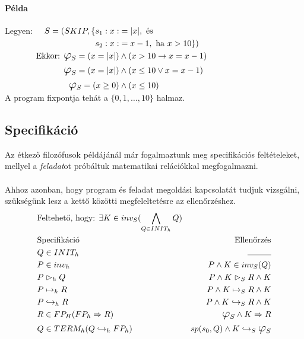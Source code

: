 \documentclass[12pt]{article}
\begin{document}
	\paragraph{Példa}
	Legyen: 
	$
	\begin{aligned}[t]
	S = (SKIP, \{s_1: x :&= |x|, \text{ és}\\
	s_2: x :&= x-1, \text{ ha } x > 10\})\\
	\text{Ekkor: }\mathlarger{\mathlarger{\varphi}}_S = (x = |x|) &\land (x>10 \rightarrow x = x-1)\\
	\mathlarger{\mathlarger{\varphi}}_S = (x = |x|) &\land (x \le 10 \lor x = x-1)\\
	\mathlarger{\mathlarger{\varphi}}_S = (x \ge 0) &\land (x \le 10)\\
	\end{aligned}
	$\\
	A program fixpontja tehát a $\{0, 1, \dots, 10 \}$ halmaz.
	
\subsection{Specifikáció}	
	Az étkező filozófusok példájánál már fogalmaztunk meg specifikációs feltételeket, mellyel a \textit{feladat}ot próbáltuk matematikai relációkkal megfogalmazni.
	\paragraph{}Ahhoz azonban, hogy program és feladat megoldási kapcsolatát tudjuk vizsgálni, szükségünk lesz a kettő közötti megfeleltetésre az ellenőrzéshez.\\
	\begin{align*}
	&\text{Feltehető, hogy: } \exists K \in inv_S ( \bigwedge_{Q \in INIT_h} Q)\\
	&\text{Specifikáció} &\text{Ellenőrzés} \\
	&Q \in INIT_h &\rule{1cm}{0.3pt}\\
	&P \in inv_h &P \land K \in inv_S(Q)\\
	&P \vartriangleright_h Q & P \land K \vartriangleright_S R \land K\\
	&P \mapsto_h R &P\land K \mapsto_S R \land K\\
	&P \hookrightarrow_h R &P \land K \hookrightarrow_S R \land K\\
    &R \in FP_H (FP_h \Rightarrow R) & \mathlarger{\mathlarger{\varphi}}_S \land K \Rightarrow R\\
    &Q \in TERM_h (Q \hookrightarrow_h FP_h) & sp(s_0, Q) \land K \hookrightarrow_S \mathlarger{\mathlarger{\varphi}}_S
	\end{align*}
	
\end{document}
